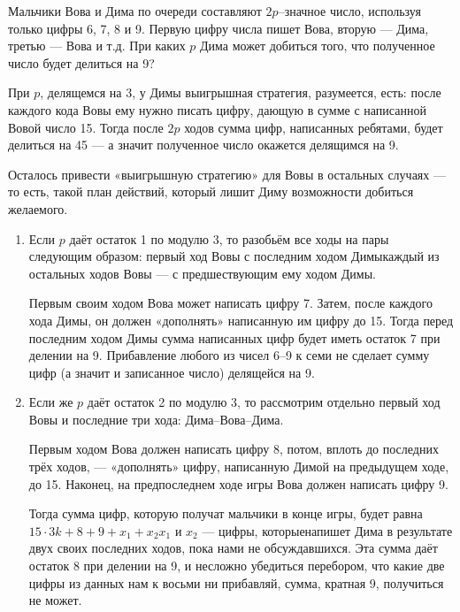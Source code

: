 \begin{itemize}

	\itC Мальчики Вова и Дима по очереди составляют $2p$--значное число, используя только цифры 6, 7, 8 и 9. Первую цифру числа пишет Вова, вторую — Дима, третью — Вова и т.д. При каких $p$ Дима может добиться того, что полученное число будет делиться на 9?
	
	\itr При $p$, делящемся на 3, у Димы выигрышная стратегия, разумеется, есть: после каждого кода Вовы ему нужно писать цифру, дающую в сумме с написанной Вовой число 15. Тогда после $2p$ ходов сумма цифр, написанных ребятами, будет делиться на 45 — а значит полученное число окажется делящимся на 9.
	
	Осталось привести «выигрышную стратегию» для Вовы в остальных случаях — то есть, такой план действий, который лишит Диму возможности добиться желаемого.
	
	\begin{enumerate}[label=\arabic*.]
	
	\item Если $p$ даёт остаток 1 по модулю 3, то разобьём все ходы на пары следующим образом: первый ход Вовы с последним ходом Димы\scolon каждый из остальных ходов Вовы — с предшествующим ему ходом Димы.
	
	Первым своим ходом Вова может написать цифру 7. Затем, после каждого хода Димы, он должен «дополнять» написанную им цифру до 15. Тогда перед последним ходом Димы сумма написанных цифр будет иметь остаток 7 при делении на 9. Прибавление любого из чисел 6–9 к семи не сделает сумму цифр (а значит и записанное число) делящейся на 9.
	
	\item Если же $p$ даёт остаток 2 по модулю 3, то рассмотрим отдельно первый ход Вовы и последние три хода: Дима–Вова–Дима.
	
	Первым ходом Вова должен написать цифру 8, потом, вплоть до последних трёх ходов, — «дополнять» цифру, написанную Димой на предыдущем ходе, до 15. Наконец, на предпоследнем ходе игры Вова должен написать цифру 9.
	
	Тогда сумма цифр, которую получат мальчики в конце игры, будет равна $15 \cdot 3k + 8 + 9 + x_1 + x_2$\scolon $x_1$ и $x_2$ — цифры, которые\linebreak напишет Дима в результате двух своих последних ходов, пока нами не обсуждавшихся. Эта сумма даёт остаток 8 при делении на 9, и несложно убедиться перебором, что какие две цифры из данных нам к восьми ни прибавляй, сумма, кратная 9, получиться не может. 
	
	\end{enumerate}

\end{itemize}

